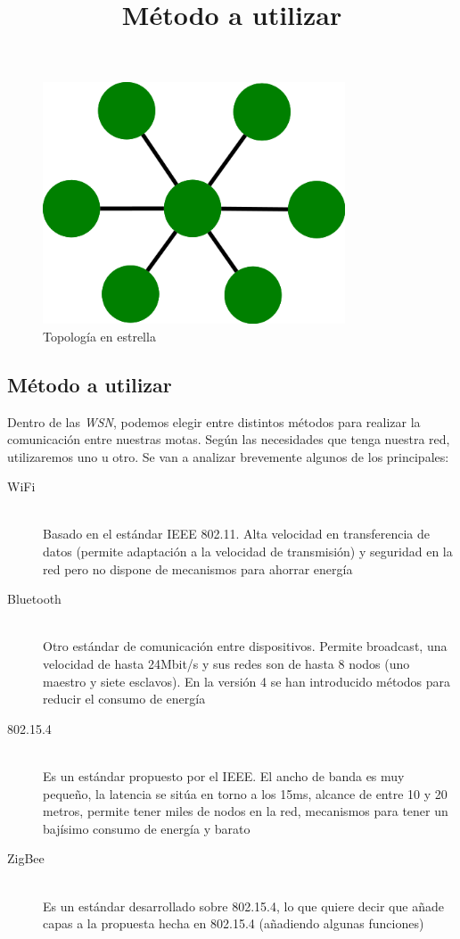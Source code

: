 \begin{figure}[htb]
\centering
\includegraphics[width=0.8\textwidth]{./imagenes/estrella}
\caption{Topología en estrella} \label{fig:estrella}
\end{figure}

\subsection{Método a utilizar}
\title{Método a utilizar}
Dentro de las \textit{WSN}, podemos elegir entre distintos métodos para realizar la
comunicación entre nuestras motas. Según las necesidades que tenga nuestra red,
utilizaremos uno u otro. Se van a analizar brevemente algunos de los principales:

\begin{description}
  \item[WiFi] \hfill \\
    Basado en el estándar IEEE 802.11. Alta velocidad en transferencia de datos
    (permite adaptación a la velocidad de transmisión) y seguridad en la red pero
    no dispone de mecanismos para ahorrar energía
  \item[Bluetooth] \hfill \\
    Otro estándar de comunicación entre dispositivos. Permite broadcast, una velocidad
    de hasta 24Mbit/s y sus redes son de hasta 8 nodos (uno maestro y siete esclavos).
    En la versión 4 se han introducido métodos para reducir el consumo de energía
  \item[802.15.4] \hfill \\
    Es un estándar propuesto por el IEEE. El ancho de banda es muy pequeño, la latencia
    se sitúa en torno a los 15ms, alcance de entre 10 y 20 metros, permite tener miles
    de nodos en la red, mecanismos para tener un bajísimo consumo de energía y barato
  \item[ZigBee] \hfill \\
    Es un estándar desarrollado sobre 802.15.4, lo que quiere decir que añade capas a la
    propuesta hecha en 802.15.4 (añadiendo algunas funciones)
\end{description}

